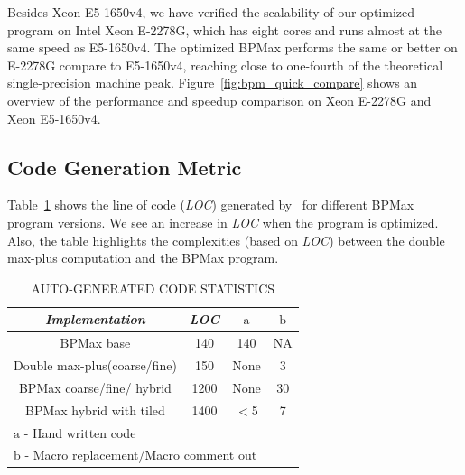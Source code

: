 Besides Xeon E5-1650v4, we have verified the scalability of our optimized program on Intel Xeon E-2278G, which has eight cores and runs almost at the same speed as E5-1650v4. The optimized BPMax performs the same or better on  E-2278G compare to E5-1650v4, reaching close to one-fourth of the theoretical single-precision machine peak. Figure~\ref{fig:bpm_quick_compare} shows an overview of the performance and speedup comparison on Xeon E-2278G  and Xeon E5-1650v4.

\subsection{Code Generation Metric}

Table~\ref{tab1:codegen_metric} shows the line of code (\textit{LOC}) generated by \alphaz\ for different BPMax program versions. We see an increase in \textit{LOC}  when the program is optimized. Also, the table highlights the complexities (based on \textit{LOC}) between the double max-plus computation and the BPMax program.

\begin{table}[htbp]
\caption{\uppercase{Auto-generated code statistics}}
\begin{center}
\begin{tabular}{|c|c|c|c|}
\hline
\textbf{\textit{Implementation}}& {\textit{LOC}} & \textbf{\textit{${\mathrm{a}}$}} & \textbf{\textit{${\mathrm{b}}$}} \\
\hline
BPMax base  & 140 & 140 & NA   \\
\hline
Double max-plus(coarse/fine)  & 150 & None & 3   \\
\hline
BPMax coarse/fine/ hybrid & 1200 & None & 30  \\
\hline
BPMax hybrid with tiled & 1400 & $<$5 & 7   \\
\hline
\multicolumn{3}{l}{${\mathrm{a}}$ - Hand written code}\\
\multicolumn{3}{l}{${\mathrm{b}}$ - Macro replacement/Macro comment out}\\
\end{tabular}
\label{tab1:codegen_metric}
\end{center}
\end{table}

